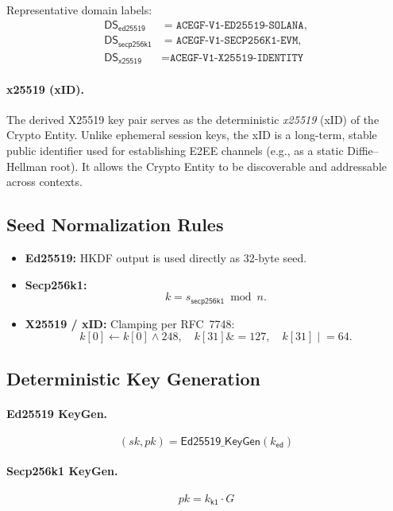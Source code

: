 \documentclass[12pt,a4paper]{article}
\begin{document}
  Representative domain labels:
  \begin{align*}
   \mathsf{DS}_{\mathsf{ed25519}}  &= \texttt{ACEGF-V1-ED25519-SOLANA}, \\
   \mathsf{DS}_{\mathsf{secp256k1}} &= \texttt{ACEGF-V1-SECP256K1-EVM}, \\
   \mathsf{DS}_{\mathsf{x25519}}  &= \texttt{ACEGF-V1-X25519-IDENTITY}
  \end{align*}

  \paragraph{x25519 (xID).}
  The derived X25519 key pair serves as the deterministic \emph{x25519} (xID) of the Crypto Entity.
  Unlike ephemeral session keys, the xID is a long-term, stable public identifier used for
  establishing E2EE channels (e.g., as a static Diffie--Hellman root).
  It allows the Crypto Entity to be discoverable and addressable across contexts.

  \subsection{Seed Normalization Rules}

  \begin{itemize}
   \item \textbf{Ed25519:}
   HKDF output is used directly as 32-byte seed.

   \item \textbf{Secp256k1:}
   \[
  k = s_{\mathsf{secp256k1}} \bmod n.
   \]

   \item \textbf{X25519 / xID:}
   Clamping per RFC~7748:
   \[
  k[0] \leftarrow k[0] \land 248,\quad
  k[31] \mathrel{\&}= 127,\quad
  k[31] \mathrel{|}= 64.
   \]
  \end{itemize}

  \subsection{Deterministic Key Generation}

  \paragraph{Ed25519 KeyGen.}
  \[
   (sk, pk) = \mathsf{Ed25519\_KeyGen}(k_{\mathsf{ed}})
  \]

  \paragraph{Secp256k1 KeyGen.}
  \[
   pk = k_{\mathsf{k1}} \cdot G
  \]
\end{document}
